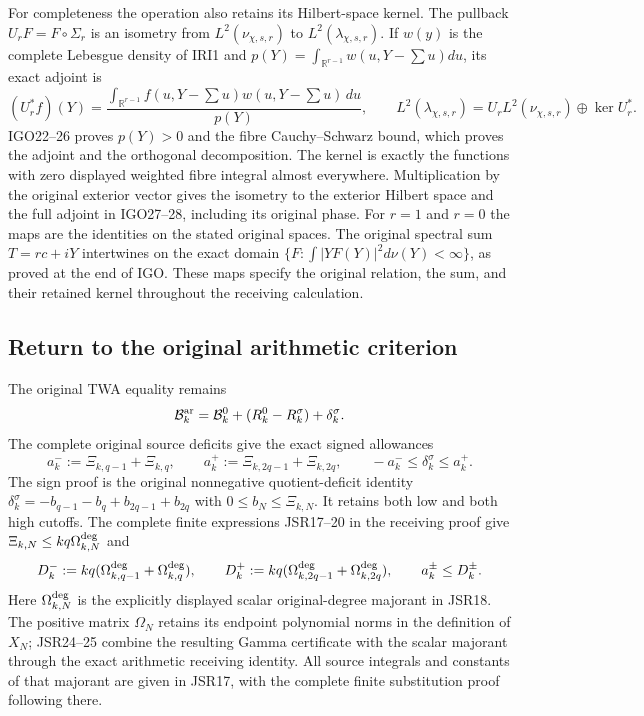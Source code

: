 \documentclass[11pt,a4paper]{article}
\begin{document}
For completeness the operation also retains its Hilbert-space
kernel. The pullback $U_rF=F\circ\Sigma_r$ is an isometry from
$L^2(\nu_{\chi,s,r})$ to $L^2(\lambda_{\chi,s,r})$. If
$w(y)$ is the complete Lebesgue density of IRI1 and
$p(Y)=\int_{\mathbb R^{r-1}}w(u,Y-\sum u)du$, its exact adjoint is
\[
 (U_r^*f)(Y)=\frac{\int_{\mathbb R^{r-1}}
                 f(u,Y-\sum u)w(u,Y-\sum u)\,du}{p(Y)},
 \qquad
 L^2(\lambda_{\chi,s,r})
       =U_rL^2(\nu_{\chi,s,r})\oplus\ker U_r^*.
 \tag{IRI5}
\]
IGO22--26 proves $p(Y)>0$ and the fibre Cauchy--Schwarz bound,
which proves the adjoint and the orthogonal decomposition. The
kernel is exactly the functions with zero displayed weighted fibre
integral almost everywhere. Multiplication by the original exterior
vector gives the isometry to the exterior Hilbert space and the
full adjoint in IGO27--28, including its original phase. For $r=1$
and $r=0$ the maps are the identities on the stated original spaces.
The original spectral sum $T=rc+iY$ intertwines on the exact domain
$\{F:\int |YF(Y)|^2d\nu(Y)<\infty\}$, as proved at the end of IGO.
These maps specify the original relation, the sum, and their retained
kernel throughout the receiving calculation.

\subsection{Return to the original arithmetic criterion}
The original TWA equality remains
\begin{equation}
 \mathcal B_k^{\rm ar}=\mathcal B_k^0+(R_k^0-R_k^\sigma)+\delta_k^\sigma.
\end{equation}
The complete original source deficits give the exact signed allowances
\begin{equation}
 a_k^-:=\Xi_{k,q-1}+\Xi_{k,q},\qquad
 a_k^+:=\Xi_{k,2q-1}+\Xi_{k,2q},\qquad
 -a_k^-\le\delta_k^\sigma\le a_k^+.
\end{equation}
The sign proof is the original nonnegative quotient-deficit identity
$\delta_k^\sigma=-b_{q-1}-b_q+b_{2q-1}+b_{2q}$ with
$0\le b_N\le\Xi_{k,N}$. It retains both low and both high cutoffs.
The complete finite expressions JSR17--20 in the receiving proof give
$\Xi_{k,N}\le kq\Omega_{k,N}^{\rm deg}$ and
\begin{equation}
 D_k^-:=kq(\Omega_{k,q-1}^{\rm deg}+\Omega_{k,q}^{\rm deg}),\qquad
 D_k^+:=kq(\Omega_{k,2q-1}^{\rm deg}+\Omega_{k,2q}^{\rm deg}),\qquad
 a_k^\pm\le D_k^\pm.
\end{equation}
Here $\Omega_{k,N}^{\rm deg}$ is the explicitly displayed scalar
original-degree majorant in JSR18. The positive matrix $\Omega_N$
retains its endpoint polynomial norms in the definition of $X_N$;
JSR24--25 combine the resulting Gamma certificate with the scalar
majorant through the exact arithmetic receiving identity. All source
integrals and constants of that majorant are given in JSR17, with
the complete finite substitution proof following there.
\end{document}
